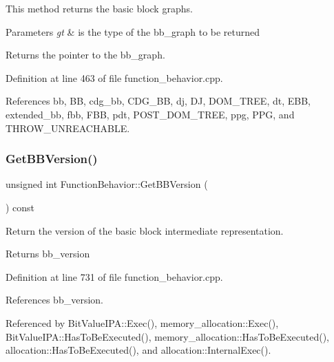 This method returns the basic block graphs. 


\begin{DoxyParams}{Parameters}
{\em gt} & is the type of the bb\+\_\+graph to be returned \\
\hline
\end{DoxyParams}
\begin{DoxyReturn}{Returns}
the pointer to the bb\+\_\+graph. 
\end{DoxyReturn}


Definition at line 463 of file function\+\_\+behavior.\+cpp.



References bb, BB, cdg\+\_\+bb, C\+D\+G\+\_\+\+BB, dj, DJ, D\+O\+M\+\_\+\+T\+R\+EE, dt, E\+BB, extended\+\_\+bb, fbb, F\+BB, pdt, P\+O\+S\+T\+\_\+\+D\+O\+M\+\_\+\+T\+R\+EE, ppg, P\+PG, and T\+H\+R\+O\+W\+\_\+\+U\+N\+R\+E\+A\+C\+H\+A\+B\+LE.

\mbox{\label{classFunctionBehavior_a5885c28dd9435e6ef9df8c507fbced96}} 
\subsubsection{\texorpdfstring{Get\+B\+B\+Version()}{GetBBVersion()}}
{\footnotesize\ttfamily unsigned int Function\+Behavior\+::\+Get\+B\+B\+Version (\begin{DoxyParamCaption}{ }\end{DoxyParamCaption}) const}



Return the version of the basic block intermediate representation. 

\begin{DoxyReturn}{Returns}
bb\+\_\+version 
\end{DoxyReturn}


Definition at line 731 of file function\+\_\+behavior.\+cpp.



References bb\+\_\+version.



Referenced by Bit\+Value\+I\+P\+A\+::\+Exec(), memory\+\_\+allocation\+::\+Exec(), Bit\+Value\+I\+P\+A\+::\+Has\+To\+Be\+Executed(), memory\+\_\+allocation\+::\+Has\+To\+Be\+Executed(), allocation\+::\+Has\+To\+Be\+Executed(), and allocation\+::\+Internal\+Exec().

